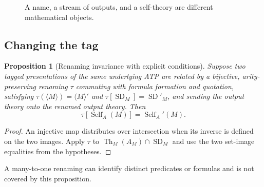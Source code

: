 \documentclass[11pt,letterpaper]{article}
\newtheorem{proposition}[theorem]{Proposition}
\theoremstyle{definition}\newtheorem{definition}[theorem]{Definition}\newtheorem{example}[theorem]{Example}\newtheorem{protocol}[theorem]{Protocol}\newtheorem{question}[theorem]{Open Problem}
\theoremstyle{remark}\newtheorem{remark}[theorem]{Remark}
\newcommand{\Th}{\operatorname{Th}}
\newcommand{\Self}{\operatorname{Self}}
\newcommand{\SD}{\operatorname{SD}}
\newcommand{\Mtag}{\langle M\rangle}
\begin{document}
\begin{figure}[htbp]
\centering{}
\caption{A name, a stream of outputs, and a self-theory are different mathematical objects.}
\end{figure}

\subsection{Changing the tag}
\begin{proposition}[Renaming invariance with explicit conditions]\label{prop:rename}
Suppose two tagged presentations of the same underlying ATP are related by a bijective, arity-preserving renaming $\tau$ commuting with formula formation and quotation, satisfying $\tau(\Mtag)=\langle M\rangle'$ and $\tau[\SD_M]=\SD'_M$, and sending the output theory onto the renamed output theory. Then
\[
\tau[\Self_A(M)]=\Self_A'(M).
\]
\end{proposition}
\begin{proof}
An injective map distributes over intersection when its inverse is defined on the two images. Apply $\tau$ to $\Th_M(A_M)\cap\SD_M$ and use the two set-image equalities from the hypotheses.
\end{proof}
A many-to-one renaming can identify distinct predicates or formulas and is not covered by this proposition.
\end{document}
